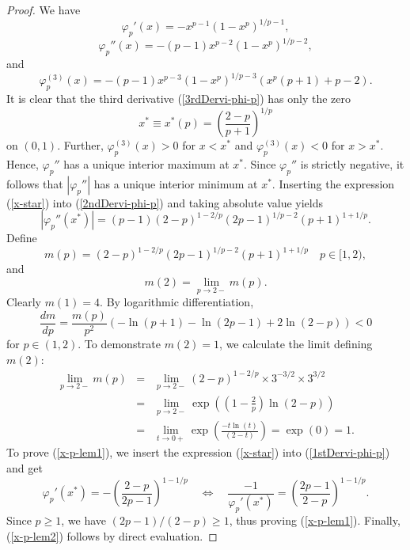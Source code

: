 \documentclass[10pt,a4paper]{amsart}
\begin{document}
\begin{proof}
We have
\begin{equation}
    \label{1stDervi-phi-p}
    \varphi_p'(x)=-x^{p-1}(1-x^p)^{1/p-1},
\end{equation}
\begin{equation}
    \label{2ndDervi-phi-p}
    \varphi_p''(x)=-(p-1)x^{p-2}(1-x^p)^{1/p-2},
\end{equation}
and
\begin{equation}
    \label{3rdDervi-phi-p}
    \varphi_p^{(3)}(x)=-(p-1)x^{p-3}(1-x^p)^{1/p-3}\left(x^p(p+1)+p-2\right).
\end{equation}
It is clear that the third derivative (\ref{3rdDervi-phi-p}) has only the zero
\begin{equation}
    \label{x-star}
    x^*\equiv x^*(p)=\left(\frac{2-p}{p+1}\right)^{1/p}
\end{equation}
on $(0,1)$. Further, $\varphi_p^{(3)}(x)>0$ for $x<x^*$ and $\varphi_p^{(3)}(x)<0$ for $x>x^*$. Hence, $\varphi_p''$ has a unique interior maximum at $x^*$. Since $\varphi_p''$ is strictly negative, it follows that $|\varphi_p''|$ has a unique interior minimum at $x^*$.
Inserting the expression (\ref{x-star}) into (\ref{2ndDervi-phi-p}) and taking absolute value yields
$$
|\varphi_p''(x^*)|=(p-1)(2-p)^{1-2/p}(2p-1)^{1/p-2}(p+1)^{1+1/p}.
$$
Define
$$
m(p)=(2-p)^{1-2/p}(2p-1)^{1/p-2}(p+1)^{1+1/p}\quad p\in[1,2), 
$$
and
$$
m(2)=\lim_{p\rightarrow2-}m(p).
$$
Clearly $m(1)=4$. By logarithmic differentiation,
$$
\frac{dm}{dp}=\frac{m(p)}{p^2}(-\ln(p+1)-\ln(2p-1)+2\ln(2-p))<0
$$
for $p\in(1,2)$. To demonstrate $m(2)=1$, we calculate the limit defining $m(2)$:
\begin{eqnarray}
\nonumber
\lim_{p\rightarrow2-}m(p)&=&\lim_{p\rightarrow2-}(2-p)^{1-2/p}\times 3^{-3/2}\times3^{3/2}\\
\nonumber
&=&\lim_{p\rightarrow2-}\exp\left(\left(1-\frac{2}{p}\right)\ln(2-p)\right)\\
\nonumber
&=&\lim_{t\rightarrow0+}\exp\left(\frac{-t\ln(t)}{(2-t)}\right)=\exp(0)=1.
\end{eqnarray}
To prove (\ref{x-p-lem1}), we insert the expression (\ref{x-star}) into (\ref{1stDervi-phi-p}) and get
$$
\varphi_p'(x^*)=-\left(\frac{2-p}{2p-1}\right)^{1-1/p}\quad\Leftrightarrow\quad\frac{-1}{\varphi_p'(x^*)}=\left(\frac{2p-1}{2-p}\right)^{1-1/p}.
$$
Since $p\ge1$, we have $(2p-1)/(2-p)\ge1$, thus proving (\ref{x-p-lem1}). Finally, (\ref{x-p-lem2}) follows by direct evaluation.
\end{proof}
\end{document}
